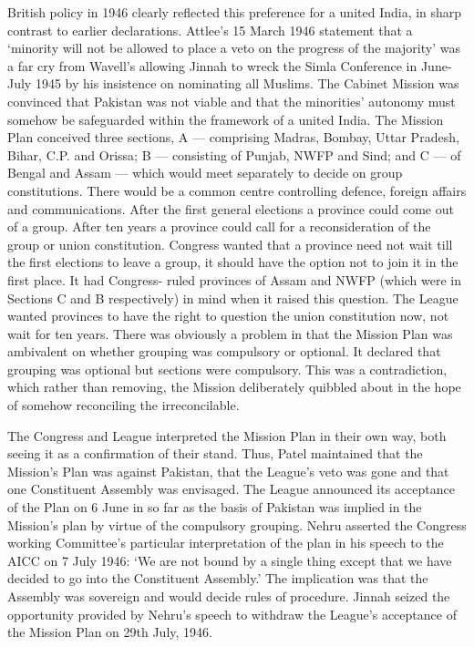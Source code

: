 \begin{multicols}{2}
British policy in 1946 clearly reflected this preference for a united India, in sharp contrast to earlier declarations. Attlee's 15 March 1946 statement that a `minority will not be allowed to place a veto on the progress of the majority' was a far cry from Wavell's allowing Jinnah to wreck the Simla Conference in June- July 1945 by his insistence on nominating all Muslims. The Cabinet Mission was convinced that Pakistan was not viable and that the minorities' autonomy must somehow be safeguarded within the framework of a united India. The Mission Plan conceived three sections, A --- comprising Madras, Bombay, Uttar Pradesh, Bihar, C.P. and Orissa; B --- consisting of Punjab, NWFP and Sind; and C --- of Bengal and Assam --- which would meet separately to decide on group constitutions. There would be a common centre controlling defence, foreign affairs and communications. After the first general elections a province could come out of a group. After ten years a province could call for a reconsideration of the group or union constitution. Congress wanted that a province need not wait till the first elections to leave a group, it should have the option not to join it in the first place. It had Congress- ruled provinces of Assam and NWFP (which were in Sections C and B respectively) in mind when it raised this question. The League wanted provinces to have the right to question the union constitution now, not wait for ten years. There was obviously a problem in that the Mission Plan was ambivalent on whether grouping was compulsory or optional. It declared that grouping was optional but sections were compulsory. This was a contradiction, which rather than removing, the Mission deliberately quibbled about in the hope of somehow reconciling the irreconcilable. 

The Congress and League interpreted the Mission Plan in their own way, both seeing it as a confirmation of their stand. Thus, Patel maintained that the Mission's Plan was against Pakistan, that the League's veto was gone and that one Constituent Assembly was envisaged. The League announced its acceptance of the Plan on 6 June in so far as the basis of Pakistan was implied in the Mission's plan by virtue of the compulsory grouping. Nehru asserted the Congress working Committee's particular interpretation of the plan in his speech to the AICC on 7 July 1946: `We are not bound by a single thing except that we have decided to go into the Constituent Assembly.' The implication was that the Assembly was sovereign and would decide rules of procedure. Jinnah seized the opportunity provided by Nehru's speech to withdraw the League's acceptance of the Mission Plan on 29th July, 1946. 


\end{multicols}
